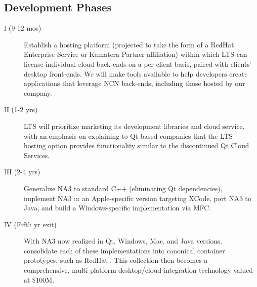 
\begin{frame}{}
\section{Development Phases}


\vspace{-.8em}



\hspace{20pt}\begin{minipage}{.996\textwidth}
{\fontsize{17}{23}\selectfont{}\selectfont \setlength{\leftmargini}{3pt}\begin{description}
\item[I (9-12 mos)] Establish a hosting platform 
(projected to take the form of a 
RedHat Enterprise Service or Kamatera Partner affiliation) within which 
LTS can license individual cloud back-ends 
on a per-client basis, paired with 
clients' desktop front-ends.  We will make tools 
available to help developers create applications 
that leverage NCN back-ends, including those hosted by 
our company.
\vspace{12pt}
\item[II (1-2 yrs)]  
LTS will prioritize marketing its development libraries 
and cloud service, 
with an emphasis on explaining to Qt-based 
companies that the LTS hosting option provides 
functionality similar to the discontinued 
Qt Cloud Services.   
\vspace{12pt}
\item[III (2-4 yrs)] Generalize NA3 to standard 
C++ (eliminating Qt dependencies),   
implement NA3 in an Apple-specific version 
targeting XCode, port NA3 to Java, and 
build a Windows-specific implementation 
via MFC.
\vspace{12pt}
\item[IV (Fifth yr exit)] With NA3 now realized 
in Qt, Windows, Mac, and Java versions, 
consolidate each of these implementations 
into canonical container prototypes, 
such as RedHat .  This 
collection then becomes 
a comprehensive, multi-platform 
desktop/cloud integration technology 
valued at \$100M.
\end{description}}\end{minipage}


\end{frame}
